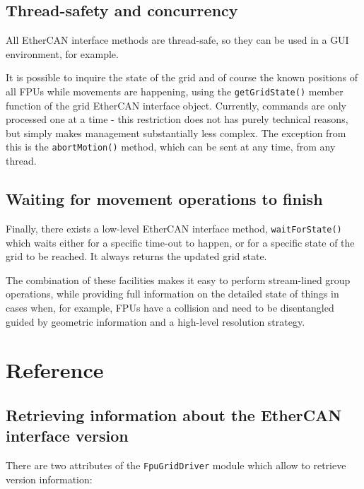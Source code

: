 \documentclass[11pt,a4paper]{report}
\begin{document}
\subsection{Thread-safety and concurrency}
All EtherCAN interface methods are thread-safe, so they can be used in a GUI
environment, for example.

It is possible to inquire the state of the grid and of course the
known positions of all FPUs while movements are happening, using the
\texttt{getGridState()} member function of the grid EtherCAN interface
object. Currently, commands are only processed one at a time - this
restriction does not has purely technical reasons, but simply makes
management substantially less complex. The exception from this is the
\texttt{abortMotion()} method, which can be sent at any time, from any
thread.

\subsection{Waiting for movement operations to finish}
Finally, there exists a low-level EtherCAN interface method,
\texttt{waitForState()} which waits either for a specific time-out to
happen, or for a specific state of the grid to be reached. It always
returns the updated grid state.

The combination of these facilities makes it easy to perform
stream-lined group operations, while providing full information on the
detailed state of things in cases when, for example, FPUs have a
collision and need to be disentangled guided by geometric information
and a high-level resolution strategy.



\section{Reference}
\label{sec:reference}

\subsection{Retrieving information about the EtherCAN interface version}
There are two attributes of the \texttt{FpuGridDriver} module
which allow to retrieve version information:
\end{document}
